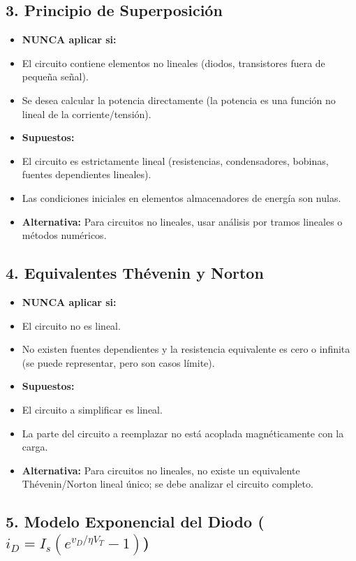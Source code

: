\documentclass[11pt,a4paper]{article}
\begin{document}
\subsection*{3. Principio de Superposición}


\begin{itemize}[leftmargin=*,topsep=2pt,itemsep=1pt]
  \item \textbf{NUNCA aplicar si:}
  \item El circuito contiene elementos no lineales (diodos, transistores fuera de pequeña señal).
  \item Se desea calcular la potencia directamente (la potencia es una función no lineal de la corriente/tensión).
  \item \textbf{Supuestos:}
  \item El circuito es estrictamente lineal (resistencias, condensadores, bobinas, fuentes dependientes lineales).
  \item Las condiciones iniciales en elementos almacenadores de energía son nulas.
  \item \textbf{Alternativa:} Para circuitos no lineales, usar análisis por tramos lineales o métodos numéricos.
\end{itemize}


\subsection*{4. Equivalentes Thévenin y Norton}


\begin{itemize}[leftmargin=*,topsep=2pt,itemsep=1pt]
  \item \textbf{NUNCA aplicar si:}
  \item El circuito no es lineal.
  \item No existen fuentes dependientes y la resistencia equivalente es cero o infinita (se puede representar, pero son casos límite).
  \item \textbf{Supuestos:}
  \item El circuito a simplificar es lineal.
  \item La parte del circuito a reemplazar no está acoplada magnéticamente con la carga.
  \item \textbf{Alternativa:} Para circuitos no lineales, no existe un equivalente Thévenin/Norton lineal único; se debe analizar el circuito completo.
\end{itemize}


\subsection*{5. Modelo Exponencial del Diodo ($i_D = I_s(e^{v_D/\eta V_T} - 1)$)}
\end{document}
